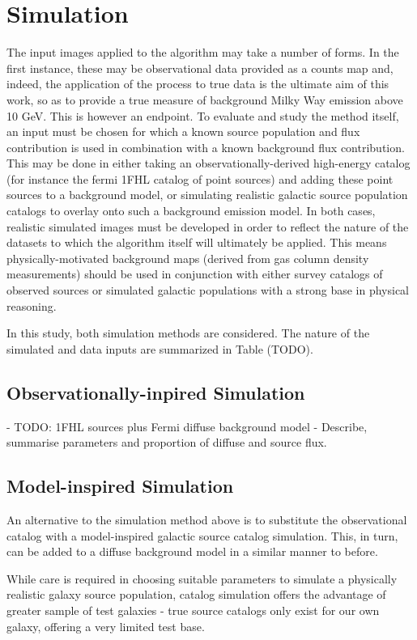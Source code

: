 \documentclass{PoS}
\begin{document}
\section{Simulation}


The input images applied to the algorithm may take a number of forms. In the first instance, these may be observational data provided as a counts map and, indeed, the application of the process to true data is the ultimate aim of this work, so as to provide a true measure of background Milky Way emission above 10 GeV. This is however an endpoint. To evaluate and study the method itself, an input must be chosen for which a known source population and flux contribution is used in combination with a known background flux contribution. This may be done in either taking an observationally-derived high-energy catalog (for instance the fermi 1FHL catalog of point sources) and adding these point sources to a background model, or simulating realistic galactic source population catalogs to overlay onto such a background emission model. In both cases, realistic simulated images must be developed in order to reflect the nature of the datasets to which the algorithm itself will ultimately be applied. This means physically-motivated background maps (derived from gas column density measurements) should be used in conjunction with either survey catalogs of observed sources or simulated galactic populations with a strong base in physical reasoning.


In this study, both simulation methods are considered. The nature of the simulated and data inputs are summarized in Table (TODO).


\subsection{Observationally-inpired Simulation}
- TODO: 1FHL sources plus Fermi diffuse background model
- Describe, summarise parameters and proportion of diffuse and source flux.

\subsection{Model-inspired Simulation}

An alternative to the simulation method above is to substitute the observational catalog with a model-inspired galactic source catalog simulation. This, in turn, can be added to a diffuse background model in a similar manner to before.

While care is required in choosing suitable parameters to simulate a physically realistic galaxy source population, catalog simulation offers the advantage of greater sample of test galaxies - true source catalogs only exist for our own galaxy, offering a very limited test base.
\end{document}
